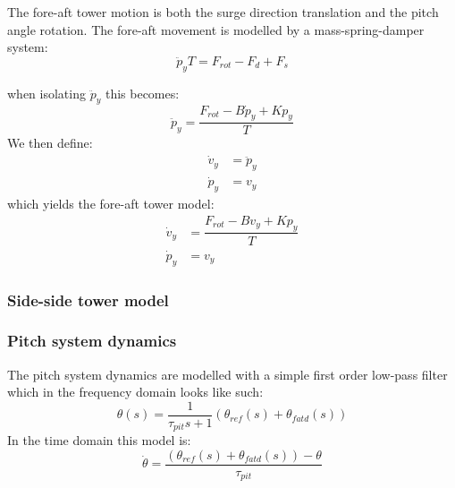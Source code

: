 The fore-aft tower motion is both the surge direction translation and the pitch angle rotation. The fore-aft movement is modelled by a mass-spring-damper system:
\begin{equation}\label{eq:wtlin_comp_fore-aft_ay1}
	\ddot{p}_y T = F_{rot} - F_d + F_s
\end{equation}

when isolating $ \ddot{p}_y $ this becomes:
\begin{equation}\label{eq:wtlin_comp_fore-aft_ay2}
	\ddot{p}_y = \dfrac{F_{rot} - B \dot{p}_y + K p_y}{T}
\end{equation}
We then define:
\begin{align}
	\dot{v}_y & = \ddot{p}_y \label{eq:wtlin_comp_fore-aft_ay} \\
	\dot{p}_y & = v_y \label{eq:wtlin_comp_fore-aft_vy}
\end{align}
which yields the fore-aft tower model:
\begin{align}
	\dot{v}_y & = \dfrac{F_{rot} - B v_y + K p_y}{T}  \label{eq:wtlin_comp_fore-aft_1} \\
	\dot{p}_y & = v_y \label{eq:wtlin_comp_fore-aft_2}
\end{align}


\subsubsection{Side-side tower model}



\subsubsection{Pitch system dynamics} \label{sec:mod_wtLin_pitch}
The pitch system dynamics are modelled with a simple first order low-pass filter which in the frequency domain looks like such:
\begin{equation}\label{eq:wtLin_pitch_freq}
	\theta(s) = \dfrac{1}{\tau_{pit} s + 1} (\theta_{ref}(s) + \theta_{fatd}(s))
\end{equation}
In the time domain this model is:
\begin{equation}\label{eq:wtLin_pitch_time}
	\dot{\theta} =\dfrac{(\theta_{ref}(s) + \theta_{fatd}(s)) - \theta}{\tau_{pit}}
\end{equation}



